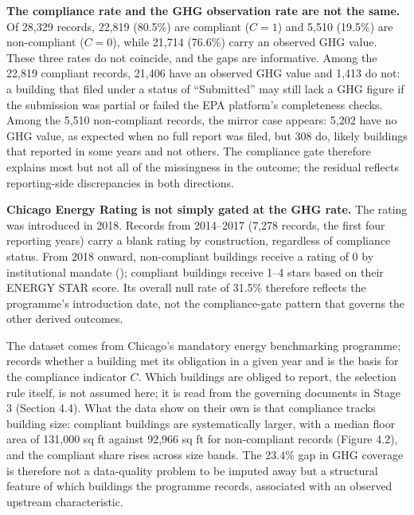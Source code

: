 \textbf{The compliance rate and the GHG observation rate are not the same.} Of 28,329 records, 22,819 (80.5\%) are compliant ($C = 1$) and 5,510 (19.5\%) are non-compliant ($C = 0$), while 21,714 (76.6\%) carry an observed GHG value. These three rates do not coincide, and the gaps are informative. Among the 22,819 compliant records, 21,406 have an observed GHG value and 1,413 do not: a building that filed under a status of ``Submitted'' may still lack a GHG figure if the submission was partial or failed the EPA platform's completeness checks. Among the 5,510 non-compliant records, the mirror case appears: 5,202 have no GHG value, as expected when no full report was filed, but 308 do, likely buildings that reported in some years and not others. The compliance gate therefore explains most but not all of the missingness in the outcome; the residual reflects reporting-side discrepancies in both directions.

\textbf{Chicago Energy Rating is not simply gated at the GHG rate.} The rating was introduced in 2018. Records from 2014--2017 (7,278 records, the first four reporting years) carry a blank rating by construction, regardless of compliance status. From 2018 onward, non-compliant buildings receive a rating of 0 by institutional mandate (); compliant buildings receive 1--4 stars based on their ENERGY STAR score. Its overall null rate of 31.5\% therefore reflects the programme's introduction date, not the compliance-gate pattern that governs the other derived outcomes.

The dataset comes from Chicago's mandatory energy benchmarking programme;  records whether a building met its obligation in a given year and is the basis for the compliance indicator $C$. Which buildings are obliged to report, the selection rule itself, is not assumed here; it is read from the governing documents in Stage 3 (Section 4.4). What the data show on their own is that compliance tracks building size: compliant buildings are systematically larger, with a median floor area of 131,000 sq ft against 92,966 sq ft for non-compliant records (Figure 4.2), and the compliant share rises across size bands. The 23.4\% gap in GHG coverage is therefore not a data-quality problem to be imputed away but a structural feature of which buildings the programme records, associated with an observed upstream characteristic.

